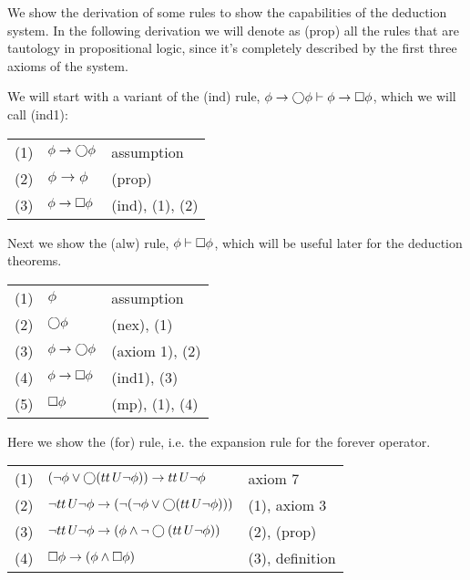 \begin{example}\label{ex:alw}
  We show the derivation of some rules to show the capabilities of the deduction system.
  In the following derivation we will denote as (prop) all the rules that are tautology in propositional
  logic, since it's completely described by the first three axioms of the system.

  We will start with a variant of the (ind) rule, $\phi \to \bigcirc{\phi} \vdash \phi \to \Box{\phi}$, which we will call (ind1):

  \medskip
  \begin{tabularx}{300pt}{cXl}
    (1) & $\phi \to \bigcirc{\phi}$ & assumption \\
    (2) & $\phi \to \phi$ & (prop) \\
    (3) & $\phi \to \Box{\phi}$ & (ind), (1), (2)
  \end{tabularx}

  \medskip
  Next we show the (alw) rule, $\phi \vdash \Box{\phi}$, which will be useful later for the deduction theorems.

  \medskip
  \begin{tabularx}{300pt}{cXl}
    (1) & $\phi$ & assumption \\
    (2) & $\bigcirc{\phi}$ & (nex), (1) \\
    (3) & $\phi \to \bigcirc{\phi}$ & (axiom 1), (2) \\
    (4) & $\phi \to \Box{\phi}$ & (ind1), (3) \\
    (5) & $\Box{\phi}$ & (mp), (1), (4) \\
  \end{tabularx}

  \medskip
  Here we show the (for) rule, i.e. the expansion rule for the forever operator.

  \medskip
  \begin{tabularx}{300pt}{cXl}
    (1) & $(\neg\phi \lor \bigcirc{({tt}\,U {\neg\phi})}) \to {tt}\,U {\neg\phi}$ & axiom 7 \\
    (2) & $\neg{tt}\,U {\neg\phi} \to (\neg(\neg\phi \lor \bigcirc{({tt}\,U {\neg\phi})}))$ & (1), axiom 3 \\
    (3) & $\neg{tt}\,U {\neg\phi} \to (\phi \land \neg\bigcirc{({tt}\,U {\neg\phi})})$ & (2), (prop) \\
    (4) & $\Box{\phi} \to (\phi \land \Box{\phi})$ & (3), definition \\
  \end{tabularx}
\end{example}

